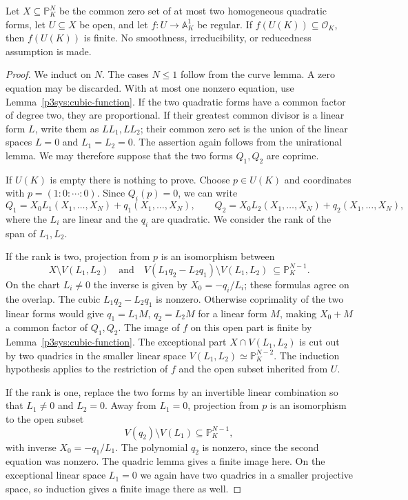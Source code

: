 \begin{theorem}\label{p3sys:two-quadrics-any-dimension}
Let $X\subseteq\mathbb P^N_K$ be the common zero set of at most
two homogeneous quadratic forms, let $U\subseteq X$ be open,
and let $f:U\to\mathbb A^1_K$ be regular.  If
$f(U(K))\subseteq\mathcal O_K$, then $f(U(K))$ is finite.
No smoothness, irreducibility, or reducedness assumption is made.
\end{theorem}
\begin{proof}
We induct on $N$.  The cases $N\le1$ follow from the curve lemma.
A zero equation may be discarded.  With at most one nonzero equation,
use Lemma~\ref{p3sys:cubic-function}.  If the two quadratic forms
have a common factor of degree two, they are proportional.  If their
greatest common divisor is a linear form $L$, write them as
$LL_1,LL_2$; their common zero set is the union of the linear
spaces $L=0$ and $L_1=L_2=0$.  The assertion again follows from
the unirational lemma.  We may therefore suppose that the two
forms $Q_1,Q_2$ are coprime.

If $U(K)$ is empty there is nothing to prove.  Choose $p\in U(K)$
and coordinates with $p=(1:0:\cdots:0)$.  Since $Q_i(p)=0$,
we can write
\[
 Q_1=X_0L_1(X_1,\ldots,X_N)+q_1(X_1,\ldots,X_N),\qquad
 Q_2=X_0L_2(X_1,\ldots,X_N)+q_2(X_1,\ldots,X_N),
\]
where the $L_i$ are linear and the $q_i$ are quadratic.  We consider
the rank of the span of $L_1,L_2$.

If the rank is two, projection from $p$ is an isomorphism between
\[
 X\setminus V(L_1,L_2)
 \quad\text{and}\quad
 V(L_1q_2-L_2q_1)\setminus V(L_1,L_2)
          \ \subseteq\mathbb P^{N-1}_K.
\]
On the chart $L_i\ne0$ the inverse is given by
$X_0=-q_i/L_i$; these formulas agree on the overlap.  The cubic
$L_1q_2-L_2q_1$ is nonzero.  Otherwise coprimality of the two
linear forms would give $q_1=L_1M$, $q_2=L_2M$ for a linear
form $M$, making $X_0+M$ a common factor of $Q_1,Q_2$.
The image of $f$ on this open part is finite by
Lemma~\ref{p3sys:cubic-function}.  The exceptional part
$X\cap V(L_1,L_2)$ is cut out by two quadrics in the smaller
linear space $V(L_1,L_2)\simeq\mathbb P^{N-2}_K$.
The induction hypothesis applies to the restriction of $f$ and
the open subset inherited from $U$.

If the rank is one, replace the two forms by an invertible linear
combination so that $L_1\ne0$ and $L_2=0$.  Away from $L_1=0$,
projection from $p$ is an isomorphism to the open subset
\[
                         V(q_2)\setminus V(L_1)
                          \subseteq\mathbb P^{N-1}_K,
\]
with inverse $X_0=-q_1/L_1$.  The polynomial $q_2$ is nonzero,
since the second equation was nonzero.  The quadric lemma gives
a finite image here.  On the exceptional linear space $L_1=0$
we again have two quadrics in a smaller projective space, so
induction gives a finite image there as well.


\end{proof}
